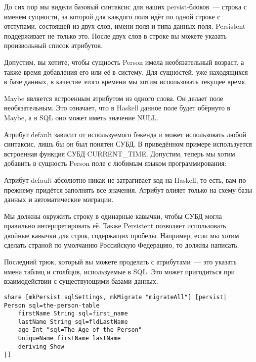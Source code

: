 До сих пор мы видели базовый синтаксис для наших persist-блоков~--- строка с именем сущности, за которой для каждого поля идёт по одной строке с отступами, состоящей из двух слов, имени поля и типа данных поля. Persistent поддерживает не только это. После двух слов в строке вы можете указать произвольный список атрибутов.

Допустим, вы хотите, чтобы сущность Person имела необязательный возраст, а также время добавления его или её в систему. Для сущностей, уже находящихся в базе данных, в качестве этого времени мы хотим использовать текущее время.


Maybe является встроенным атрибутом из одного слова. Он делает поле необязательным. Это означает, что в Haskell данное поле будет обёрнуто в Maybe, а в SQL оно может иметь значение NULL.

Атрибут default зависит от используемого бэкенда и может использовать любой синтаксис, лишь бы он был понятен СУБД. В приведённом примере используется встроенная функция СУБД CURRENT\_TIME. Допустим, теперь мы хотим добавить в сущность Person поле с любимым языком программирования:


\begin{remark}
Атрибут default абсолютно никак не затрагивает код на Haskell, то есть, вам по-прежнему придётся заполнять все значения. Атрибут влияет только на схему базы данных и автоматические миграции.
\end{remark}

Мы должны окружить строку в одинарные кавычки, чтобы СУБД могла правильно интерпретировать её. Также Persistent позволяет использовать двойные кавычки для строк, содержащих пробелы. Например, если мы хотим сделать страной по умолчанию Российскую Федерацию, то должны написать:


Последний трюк, который вы можете проделать с атрибутами~--- это указать имена таблиц и столбцов, используемые в SQL. Это может пригодиться при взаимодействии с существующими базами данных.

\begin{lstlisting}
share [mkPersist sqlSettings, mkMigrate "migrateAll"] [persist|
Person sql=the-person-table
    firstName String sql=first_name
    lastName String sql=fldLastName
    age Int "sql=The Age of the Person"
    UniqueName firstName lastName
    deriving Show
|]
\end{lstlisting}%

